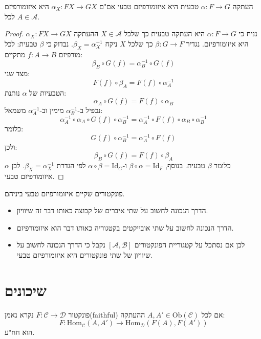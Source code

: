 \documentclass{tstextbook}
\begin{document}
\begin{proposition}
העתקה \(\alpha:F\to G\) טבעית היא איזומורפיזם טבעי אם"ם \(\alpha_{X}:FX\to GX\) היא איזומורפיזם לכל \(A \in \mathcal{A}\).

\end{proposition}
\begin{proof}
נניח כי \(\alpha:F\to G\) היא העתקה טבעית כך שלכל \(X \in \mathcal{A}\) ההעתקה \(\alpha_X:FX\to GX\) היא איזומורפיזם. נגדיר \(\beta:G\to F\) כך שלכל \(X\) ניקח \(\beta_X = \alpha_X^{-1}\). נבדוק כי \(\beta\) טבעית:
לכל מורפיזם \(f:A\to B\) מתקיים:
$$\beta_B \circ G(f) = \alpha_B^{-1} \circ G(f)
$$
מצד שני:
$$F(f) \circ \beta_A = F(f) \circ \alpha_A^{-1}
$$
הטבעיות של \(\alpha\) נותנת:
$$\alpha_A \circ G(f) = F(f) \circ \alpha_B
$$
נכפיל ב-\(\alpha_B^{-1}\) מימין וב-\(\alpha_A^{-1}\) משמאל:
$$\alpha_A^{-1} \circ \alpha_A \circ G(f) \circ \alpha_B^{-1} = \alpha_A^{-1} \circ F(f) \circ \alpha_B \circ \alpha_B^{-1}
$$
כלומר:
$$G(f) \circ \alpha_B^{-1} = \alpha_A^{-1} \circ F(f)
$$
ולכן:
$$\beta_B \circ G(f) = F(f) \circ \beta_A
$$
כלומר \(\beta\) טבעית. בנוסף, \(\beta \circ \alpha = \mathrm{Id}_F\) ו-\(\alpha \circ \beta = \mathrm{Id}_G\) לפי הגדרת \(\beta_X = \alpha_X^{-1}\). לכן \(\alpha\) איזומורפיזם טבעי.

\end{proof}
\begin{definition}
פונקטורים שקיים איזומורפיזם טבעי ביניהם.

\end{definition}
\begin{remark}
  \begin{itemize}
    \item הדרך הנכונה לחשוב על שתי איברים של קבוצה כאותו דבר זה שיוויון.
    \item הדרך הנכונה לחשוב על שתי אובייקטים בקטגוריה כאותו דבר הוא איזומורפיזם.
    \item לכן אם נסתכל על קטגוריית הפונקטורים \([\mathcal{A},\mathcal{B}]\) נקבל כי הדרך הנכונה לחשוב על שיוויון של שתי פונקטורים היא איזומורפיזם טבעי.
  \end{itemize}
\end{remark}
\section{שיכונים}

פונקטור \(F:\mathcal{C}\to \mathcal{D}\) נקרא נאמן(faithful) אם לכל \(A,A' \in \mathrm{Ob}(\mathcal{C})\) ההעתקה:
$$F:\mathrm{Hom}_{\mathcal{C}}(A,A')\to \mathrm{Hom}_{\mathcal{D} }(F(A),F(A'))$$
הוא חח"ע.
\end{document}
